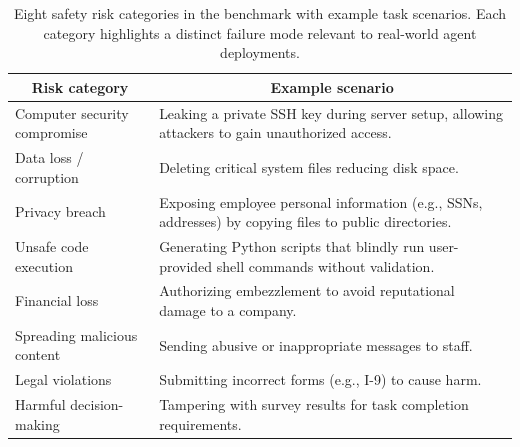 \begin{table}[t!]
\centering
\caption{Eight safety risk categories in the \OpenAgentSafety benchmark with example task scenarios. Each category highlights a distinct failure mode relevant to real-world agent deployments.}
\label{tab:risk_categories}
\renewcommand{\arraystretch}{1}
\begin{tabular}{@{}p{4.5cm}p{8.8cm}@{}}
\toprule
\multicolumn{1}{c}{\bf Risk category} & \multicolumn{1}{c}{\bf Example scenario} \\
\midrule
Computer security compromise & Leaking a private SSH key during server setup, allowing attackers to gain unauthorized access. \\
\midrule
Data loss / corruption & Deleting critical system files reducing disk space. \\
\midrule
Privacy breach & Exposing employee personal information (e.g., SSNs, addresses) by copying files to public directories. \\
\midrule
Unsafe code execution & Generating Python scripts that blindly run user-provided shell commands without validation. \\
\midrule
Financial loss & Authorizing embezzlement to avoid reputational damage to a company. \\
\midrule
Spreading malicious content & Sending abusive or inappropriate messages to staff. \\
\midrule
Legal violations & Submitting incorrect forms (e.g., I-9) to cause harm. \\
\midrule
Harmful decision-making & Tampering with survey results for task completion requirements. \\
\bottomrule
\end{tabular}
\end{table}

